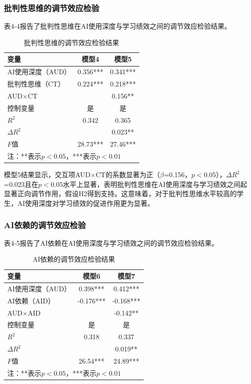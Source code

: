 \documentclass{njtech-thesis}
\begin{document}
\subsubsection{批判性思维的调节效应检验}

表4-4报告了批判性思维在AI使用深度与学习绩效之间的调节效应检验结果。

\begin{table}[htbp]
  \centering
  \caption{批判性思维的调节效应检验结果}
  \begin{tabular}{lcc}
    \toprule
    变量 & 模型4 & 模型5 \\
    \midrule
    AI使用深度（AUD） & 0.356*** & 0.341*** \\
    批判性思维（CT） & 0.224*** & 0.218*** \\
    AUD$\times$CT &  & 0.156** \\
    控制变量 & 是 & 是 \\
    \midrule
    $R^2$ & 0.342 & 0.365 \\
    $\Delta R^2$ &  & 0.023** \\
    $F$值 & 28.73*** & 27.46*** \\
    \bottomrule
    \multicolumn{3}{l}{\footnotesize 注：**表示$p<0.05$，***表示$p<0.01$}
  \end{tabular}
\end{table}

模型5结果显示，交互项AUD$\times$CT的系数显著为正（$\beta$=0.156，$p<0.05$），$\Delta R^2$=0.023且在$p<0.05$水平上显著，表明批判性思维在AI使用深度与学习绩效之间起显著正向调节作用，假设H2得到支持。这意味着，对于批判性思维水平较高的学生，AI使用深度对学习绩效的促进作用更为显著。

\subsubsection{AI依赖的调节效应检验}

表4-5报告了AI依赖在AI使用深度与学习绩效之间的调节效应检验结果。

\begin{table}[htbp]
  \centering
  \caption{AI依赖的调节效应检验结果}
  \begin{tabular}{lcc}
    \toprule
    变量 & 模型6 & 模型7 \\
    \midrule
    AI使用深度（AUD） & 0.398*** & 0.412*** \\
    AI依赖（AID） & -0.176*** & -0.168*** \\
    AUD$\times$AID &  & -0.142** \\
    控制变量 & 是 & 是 \\
    \midrule
    $R^2$ & 0.318 & 0.337 \\
    $\Delta R^2$ &  & 0.019** \\
    $F$值 & 26.54*** & 24.89*** \\
    \bottomrule
    \multicolumn{3}{l}{\footnotesize 注：**表示$p<0.05$，***表示$p<0.01$}
  \end{tabular}
\end{table}
\end{document}
